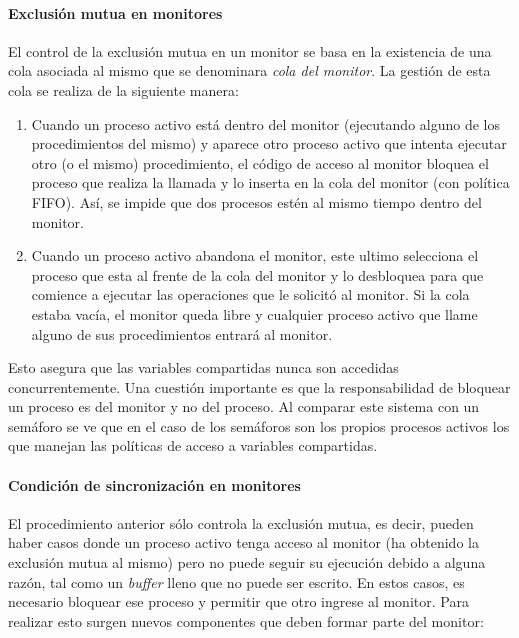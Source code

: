 \paragraph{Exclusión mutua en monitores}
\hfill
\par El control de la exclusión mutua en un monitor se basa en la existencia de una cola asociada al mismo que se denominara \textit{cola del monitor}. La gestión de esta cola se realiza de la siguiente manera:

\begin{enumerate}
    \item Cuando un proceso activo está dentro del monitor (ejecutando alguno de los procedimientos del mismo) y aparece otro proceso activo que intenta ejecutar otro (o el mismo) procedimiento, el código de acceso al monitor bloquea el proceso que realiza la llamada y lo inserta en la cola del monitor (con política FIFO). Así, se impide que dos procesos estén al mismo tiempo dentro del monitor.

    \item Cuando un proceso activo abandona el monitor, este ultimo selecciona el proceso que esta al frente de la cola del monitor y lo desbloquea para que comience a ejecutar las operaciones que le solicitó al monitor. Si la cola estaba vacía, el monitor queda libre y cualquier proceso activo que llame alguno de sus procedimientos entrará al monitor.
\end{enumerate}

Esto asegura que las variables compartidas nunca son accedidas concurrentemente. Una cuestión importante es que la responsabilidad de bloquear un proceso es del monitor y no del proceso.
Al comparar este sistema con un semáforo se ve que en el caso de los semáforos son los propios procesos activos los que manejan las políticas de acceso a variables compartidas.

\paragraph{Condición de sincronización en monitores}
\hfill
\par El procedimiento anterior sólo controla la exclusión mutua, es decir, pueden haber casos donde un proceso activo tenga acceso al monitor (ha obtenido la exclusión mutua al mismo) pero no puede seguir su ejecución debido a alguna razón, tal como un \textit{buffer} lleno que no puede ser escrito. En estos casos, es necesario bloquear ese proceso y permitir que otro ingrese al monitor. Para realizar esto surgen nuevos componentes que deben formar parte del monitor:

